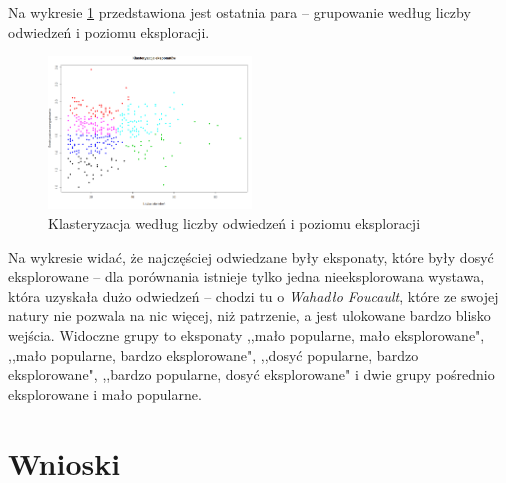 \documentclass[conference]{IEEEtran}
\begin{document}
Na wykresie \ref{klasteryzacja_odw_zach} przedstawiona jest ostatnia para -- grupowanie według liczby odwiedzeń i poziomu eksploracji.
\begin{figure}[H]
\includegraphics[width=0.48\textwidth]{klasteryzacja_odw_zach.png}
\caption{Klasteryzacja według liczby odwiedzeń i poziomu eksploracji}
\label{klasteryzacja_odw_zach}
\end{figure}
Na wykresie widać, że najczęściej odwiedzane były eksponaty, które były dosyć eksplorowane -- dla porównania istnieje tylko jedna nieeksplorowana wystawa, która uzyskała dużo odwiedzeń -- chodzi tu o \textit{Wahadło Foucault}, które ze swojej natury nie pozwala na nic więcej, niż patrzenie, a jest ulokowane bardzo blisko wejścia. 
Widoczne grupy to eksponaty ,,mało popularne, mało eksplorowane", ,,mało popularne, bardzo eksplorowane", ,,dosyć popularne, bardzo eksplorowane", ,,bardzo popularne, dosyć eksplorowane" i dwie grupy pośrednio eksplorowane i mało popularne.

\section{Wnioski}
\end{document}
